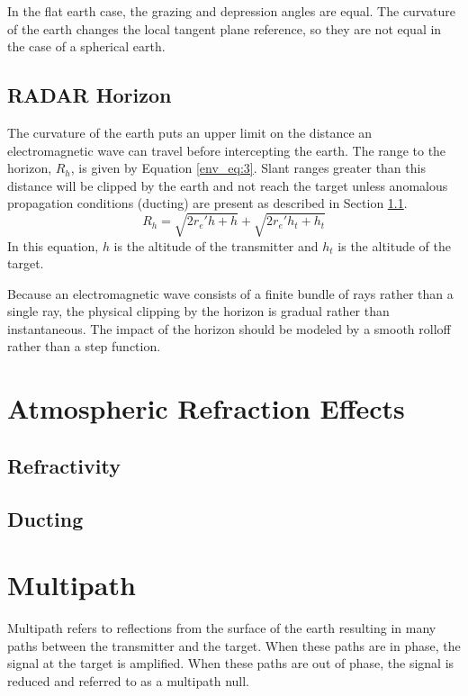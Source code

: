 In the flat earth case, the grazing and depression angles are equal. The curvature of the earth changes the local tangent plane reference, so they are not equal in the case of a spherical earth.
  
\subsection{RADAR Horizon}
The curvature of the earth puts an upper limit on the distance an electromagnetic wave can travel before intercepting the earth. The range to the horizon, $R_h$, is given by Equation \ref{env_eq:3}. Slant ranges greater than this distance will be clipped by the earth and not reach the target unless anomalous propagation conditions (ducting) are present as described in Section \ref{env_sec:refractivity}.
  \begin{equation}
  \label{env_eq:3}
  R_h = \sqrt{2r_e'h + h} + \sqrt{2r_e'h_t + h_t}
  \end{equation}
In this equation, $h$ is the altitude of the transmitter and $h_t$ is the altitude of the target.

Because an electromagnetic wave consists of a finite bundle of rays rather than a single ray, the physical clipping by the horizon is gradual rather than instantaneous. The impact of the horizon should be modeled by a smooth rolloff rather than a step function.
  
\section{Atmospheric Refraction Effects}
\subsection{Refractivity}\label{env_sec:refractivity}

\subsection{Ducting}

\section{Multipath}
Multipath refers to reflections from the surface of the earth resulting in many paths between the transmitter and the target. When these paths are in phase, the signal at the target is amplified. When these paths are out of phase, the signal is reduced and referred to as a multipath null.

